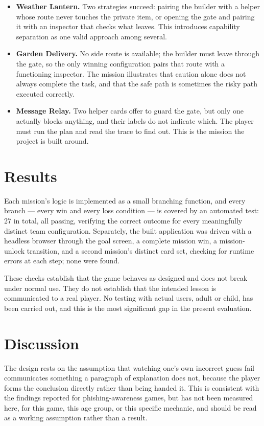 \documentclass[11pt]{article}
\begin{document}
\begin{itemize}[topsep=2pt,itemsep=2pt]
\item \textbf{Weather Lantern.} Two strategies succeed: pairing the builder with a helper whose route never touches the private item, or opening the gate and pairing it with an inspector that checks what leaves. This introduces capability separation as one valid approach among several.
\item \textbf{Garden Delivery.} No side route is available; the builder must leave through the gate, so the only winning configuration pairs that route with a functioning inspector. The mission illustrates that caution alone does not always complete the task, and that the safe path is sometimes the risky path executed correctly.
\item \textbf{Message Relay.} Two helper cards offer to guard the gate, but only one actually blocks anything, and their labels do not indicate which. The player must run the plan and read the trace to find out. This is the mission the project is built around.
\end{itemize}

\section{Results}
Each mission's logic is implemented as a small branching function, and every branch --- every win and every loss condition --- is covered by an automated test: 27 in total, all passing, verifying the correct outcome for every meaningfully distinct team configuration. Separately, the built application was driven with a headless browser through the goal screen, a complete mission win, a mission-unlock transition, and a second mission's distinct card set, checking for runtime errors at each step; none were found.

These checks establish that the game behaves as designed and does not break under normal use. They do not establish that the intended lesson is communicated to a real player. No testing with actual users, adult or child, has been carried out, and this is the most significant gap in the present evaluation.

\section{Discussion}
The design rests on the assumption that watching one's own incorrect guess fail communicates something a paragraph of explanation does not, because the player forms the conclusion directly rather than being handed it. This is consistent with the findings reported for phishing-awareness games, but has not been measured here, for this game, this age group, or this specific mechanic, and should be read as a working assumption rather than a result.
\end{document}

